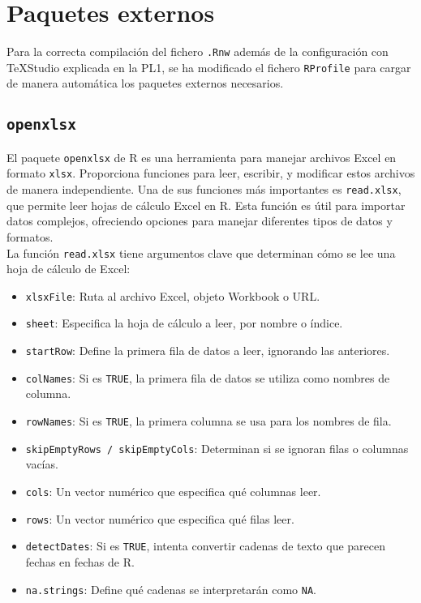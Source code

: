\documentclass[12pt]{report}\usepackage[]{graphicx}\usepackage[dvipsnames]{xcolor}
\begin{document}
 	
 	\chapter{Paquetes externos}\label{ap:PaquetesExternos}
 	
 		Para la correcta compilación del fichero \texttt{.Rnw} además de la configuración con \TeX Studio explicada en la PL1, se ha modificado el fichero \texttt{RProfile} para cargar de manera automática los paquetes externos necesarios. 
 		
 		
 	
	 	\section{\texttt{openxlsx}}
	 	
		 	El paquete \texttt{openxlsx} de R es una herramienta para manejar archivos Excel en formato \texttt{xlsx}. Proporciona funciones para leer, escribir, y modificar estos archivos de manera independiente. Una de sus funciones más importantes es \texttt{read.xlsx}, que permite leer hojas de cálculo Excel en R. Esta función es útil para importar datos complejos, ofreciendo opciones para manejar diferentes tipos de datos y formatos.\\
		 	
		 	La función \texttt{read.xlsx} tiene argumentos clave que determinan cómo se lee una hoja de cálculo de Excel:
		 	
		 	\begin{itemize}
		 		\item \texttt{xlsxFile}: Ruta al archivo Excel, objeto Workbook o URL.
		 		\item \texttt{sheet}: Especifica la hoja de cálculo a leer, por nombre o índice.
		 		\item \texttt{startRow}: Define la primera fila de datos a leer, ignorando las anteriores.
		 		\item \texttt{colNames}: Si es \texttt{TRUE}, la primera fila de datos se utiliza como nombres de columna.
		 		\item \texttt{rowNames}: Si es \texttt{TRUE}, la primera columna se usa para los nombres de fila.
		 		\item \texttt{skipEmptyRows / skipEmptyCols}: Determinan si se ignoran filas o columnas vacías.
		 		\item \texttt{cols}: Un vector numérico que especifica qué columnas leer.
		 		\item \texttt{rows}: Un vector numérico que especifica qué filas leer.
		 		\item \texttt{detectDates}: Si es \texttt{TRUE}, intenta convertir cadenas de texto que parecen fechas en fechas de R.
		 		\item \texttt{na.strings}: Define qué cadenas se interpretarán como \texttt{NA}.
		 	\end{itemize}
		 	
\end{document}

